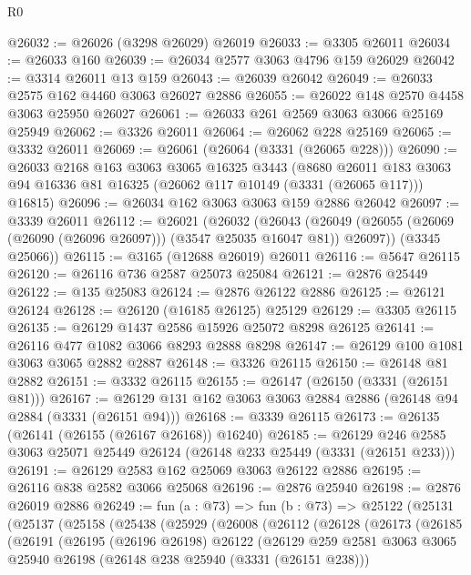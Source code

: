\begin{lexlean}{R0}
\begin{coremodule}
@26032 := @26026 (@3298 @26029) @26019
@26033 := @3305 @26011
@26034 := @26033 @160
@26039 := @26034 @2577 @3063 @4796 @159 @26029
@26042 := @3314 @26011 @13 @159
@26043 := @26039 @26042
@26049 := @26033 @2575 @162 @4460 @3063 @26027 @2886
@26055 := @26022 @148 @2570 @4458 @3063 @25950 @26027
@26061 := @26033 @261 @2569 @3063 @3066 @25169 @25949
@26062 := @3326 @26011
@26064 := @26062 @228 @25169
@26065 := @3332 @26011
@26069 := @26061 (@26064 (@3331 (@26065 @228)))
@26090 := @26033
    @2168
    @163
    @3063
    @3065
    @16325
    @3443
    (@8680
      @26011
      @183
      @3063
      @94
      @16336
      @81
      @16325
      (@26062 @117 @10149 (@3331 (@26065 @117)))
      @16815)
@26096 := @26034 @162 @3063 @3063 @159 @2886 @26042
@26097 := @3339 @26011
@26112 := @26021
    (@26032
      (@26043 (@26049 (@26055 (@26069 (@26090 (@26096 @26097))) (@3547 @25035 @16047 @81)) @26097))
      (@3345 @25066))
@26115 := @3165 (@12688 @26019) @26011
@26116 := @5647 @26115
@26120 := @26116 @736 @2587 @25073 @25084
@26121 := @2876 @25449
@26122 := @135 @25083
@26124 := @2876 @26122 @2886
@26125 := @26121 @26124
@26128 := @26120 (@16185 @26125) @25129
@26129 := @3305 @26115
@26135 := @26129 @1437 @2586 @15926 @25072 @8298 @26125
@26141 := @26116 @477 @1082 @3066 @8293 @2888 @8298
@26147 := @26129 @100 @1081 @3063 @3065 @2882 @2887
@26148 := @3326 @26115
@26150 := @26148 @81 @2882
@26151 := @3332 @26115
@26155 := @26147 (@26150 (@3331 (@26151 @81)))
@26167 := @26129 @131 @162 @3063 @3063 @2884 @2886 (@26148 @94 @2884 (@3331 (@26151 @94)))
@26168 := @3339 @26115
@26173 := @26135 (@26141 (@26155 (@26167 @26168)) @16240)
@26185 := @26129 @246 @2585 @3063 @25071 @25449 @26124 (@26148 @233 @25449 (@3331 (@26151 @233)))
@26191 := @26129 @2583 @162 @25069 @3063 @26122 @2886
@26195 := @26116 @838 @2582 @3066 @25068
@26196 := @2876 @25940
@26198 := @2876 @26019 @2886
@26249 := fun (a : @73) =>
  fun (b : @73) =>
  @25122
    (@25131
      (@25137
        (@25158
          (@25438
            (@25929
              (@26008
                (@26112
                  (@26128
                    (@26173
                      (@26185
                        (@26191
                          (@26195
                            (@26196 @26198)
                            @26122
                            (@26129
                              @259
                              @2581
                              @3063
                              @3065
                              @25940
                              @26198
                              (@26148 @238 @25940 (@3331 (@26151 @238)))

\end{coremodule}
\end{lexlean}
